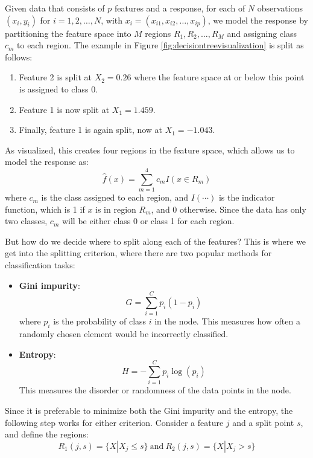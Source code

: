 \documentclass[english,11pt,a4paper,titlepage]{article}
\begin{document}
	Given data that consists of \( p \) features and a response, for each of \( N \) observations \((x_i, y_i)\) for \( i = 1, 2, \ldots, N \), with \( x_i = (x_{i1}, x_{i2}, \ldots, x_{ip}) \), we model the response by partitioning the feature space into \( M \) regions \( R_1, R_2, \ldots, R_M \) and assigning class \( c_m \) to each region. The example in Figure \ref{fig:decisiontreevisualization} is split as follows:	
	\begin{enumerate}
		\item Feature 2 is split at \(X_2 = 0.26\) where the feature space at or below this point is assigned to class 0.
		\item Feature 1 is now split at \(X_1 = 1.459\).
		\item Finally, feature 1 is again split, now at \(X_1 = -1.043\).
	\end{enumerate}
	
	As visualized, this creates four regions in the feature space, which allows us to model the response as:
	\begin{equation*}
		\hat{f}(x) = \sum_{m=1}^{4} c_m I(x \in R_m)
	\end{equation*}
	where \( c_m \) is the class assigned to each region, and \( I(\cdots) \) is the indicator function, which is 1 if \( x \) is in region \( R_m \), and 0 otherwise. Since the data has only two classes, \( c_m \) will be either class 0 or class 1 for each region.
	
	But how do we decide where to split along each of the features? This is where we get into the splitting criterion, where there are two popular methods for classification tasks:
	
	\begin{itemize}
		\item \textbf{Gini impurity}:
		\begin{equation*}
			G = \sum_{i=1}^{C}p_i(1-p_i)
		\end{equation*}
		where $p_i$ is the probability of class $i$ in the node. This measures how often a randomly chosen element would be incorrectly classified.
		\item \textbf{Entropy}:
		\begin{equation*}
			H = -\sum_{i=1}^{C}p_i\log(p_i)
		\end{equation*}
		This measures the disorder or randomness of the data points in the node.
	\end{itemize}
	Since it is preferable to minimize both the Gini impurity and the entropy, the following step works for either criterion. Consider a feature \( j \) and a split point \( s \), and define the regions:
	\begin{equation*}
		R_1(j, s) = \{X|X_j \leq s\}\ \text{and}\ R_2(j, s) = \{X|X_j > s\}
	\end{equation*}
	
\end{document}
